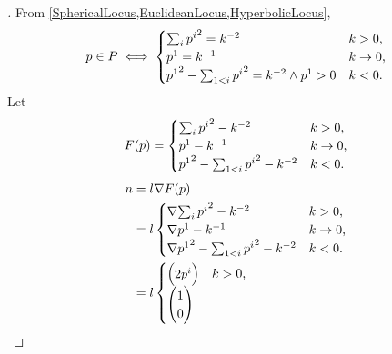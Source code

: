 \documentclass[../main.tex]{subfiles}
\begin{document}
\begin{proof}[]
    From \cref{SphericalLocus,EuclideanLocus,HyperbolicLocus},
    \begin{equation*}
        p \in P \iff
        \begin{cases}
           \sum_{i}{{\tensor{p}{^i}}^2}=k^{-2} & \text{$k>0$,} \\
           \tensor{p}{^1} = k^{-1} \iffalse{\wedge \tensor{p}{^i} = \tensor{\theta}{^{i-1}}}\fi & \text{$k\to 0$,} \\
             {\tensor{p}{^1}}^2 - \sum_{1<i}{{\tensor{p}{^i}}^2}=k^{-2} \wedge \tensor{p}{^1} > 0 & \text{$k<0$.} \\
        \end{cases}
    \end{equation*}
    Let
    \begin{equation*}
        F(p) = \begin{cases}
           \sum_{i}{{\tensor{p}{^i}}^2}-k^{-2} & \text{$k>0$,} \\
           \tensor{p}{^1} - k^{-1} & \text{$k\to 0$,} \\
             {\tensor{p}{^1}}^2 - \sum_{1<i}{{\tensor{p}{^i}}^2}-k^{-2} & \text{$k<0$.} \\
        \end{cases}
    \end{equation*}
    \begin{align*}
        n
        &= l \nabla F(p) \\
        &= l \begin{cases}
            \nabla{\sum_{i}{{\tensor{p}{^i}}^2}-k^{-2}} & \text{$k>0$,} \\
            \nabla{\tensor{p}{^1} - k^{-1}} & \text{$k\to 0$,} \\
            \nabla{{\tensor{p}{^1}}^2 - \sum_{1<i}{{\tensor{p}{^i}}^2}-k^{-2}} & \text{$k<0$.} \\
         \end{cases} \\
         &= l \begin{cases}
            \begin{pmatrix}
                2\tensor{p}{^i} \\
            \end{pmatrix} & \text{$k>0$,} \\
            \begin{pmatrix}
                1 \\
                0 \\

\end{pmatrix}
\end{cases}
\end{align*}
\end{proof}
\end{document}
